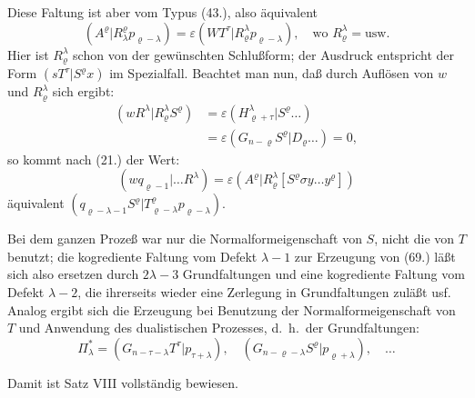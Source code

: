 \documentclass[12pt,a4paper]{article}
\begin{document}
Diese Faltung ist aber vom Typus (43.), also äquivalent
\begin{equation*}
(A^{\varrho} | R^{\varrho}_{\lambda} p_{\varrho-\lambda}) = \varepsilon (W T^{\tau} | R^{\lambda}_{\varrho} p_{\varrho-\lambda}), \quad \text{wo } R^{\lambda}_{\varrho} = \text{usw.}
\end{equation*}
Hier ist $R^{\lambda}_{\varrho}$ schon von der gewünschten Schlußform; der Ausdruck entspricht der Form $(s T^{\tau} | S^{\varrho} x)$ im Spezialfall. Beachtet man nun, daß durch Auflösen von $w$ und $R^{\lambda}_{\varrho}$ sich ergibt:
\begin{align*}
(w R^{\lambda} | R^{\lambda}_{\varrho} S^{\varrho}) &= \varepsilon (H^{\lambda}_{\varrho+\tau} | S^{\varrho} \ldots) \\
&= \varepsilon (G_{n-\varrho} S^{\varrho} | D_{\varrho} \ldots) = 0,
\end{align*}
so kommt nach (21.) der Wert:
\begin{equation*}
(w q_{\varrho-1} | \ldots R^{\lambda}) = \varepsilon (A^{\varrho} | R^{\lambda}_{\varrho} [S^{\varrho} \sigma y \ldots y^{\varrho}])
\end{equation*}
äquivalent $(q_{\varrho-\lambda-1} S^{\varrho} | T^{\varrho}_{\varrho-\lambda} p_{\varrho-\lambda})$.

Bei dem ganzen Prozeß war nur die Normalformeigenschaft von $S$, nicht die von $T$ benutzt; die kogrediente Faltung vom Defekt $\lambda-1$ zur Erzeugung von (69.) läßt sich also ersetzen durch $2\lambda-3$ Grundfaltungen und eine kogrediente Faltung vom Defekt $\lambda-2$, die ihrerseits wieder eine Zerlegung in Grundfaltungen zuläßt usf. Analog ergibt sich die Erzeugung bei Benutzung der Normalformeigenschaft von $T$ und Anwendung des dualistischen Prozesses, d.\ h.\ der Grundfaltungen:
\begin{equation*}
\Pi^{*}_{\lambda} = (G_{n-\tau-\lambda} T^{\tau} | p_{\tau+\lambda}), \quad (G_{n-\varrho-\lambda} S^{\varrho} | p_{\varrho+\lambda}), \quad \ldots
\end{equation*}

Damit ist Satz VIII vollständig bewiesen.
\end{document}
